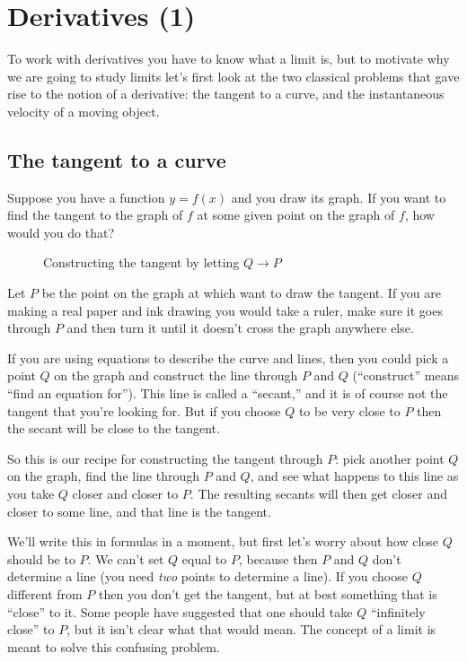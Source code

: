 \chapter{Derivatives (1)}
\label{ch:derivs1}
To work with derivatives you have to know what a limit is, but to motivate why
we are going to study limits let's first look at the two classical problems that
gave rise to the notion of a derivative: the tangent to a curve, and the
instantaneous velocity of a moving object.

\section{The tangent to a curve}
\label{sec:tangent} Suppose you have a function $y=f(x)$ and you draw its graph.
If you want to find the tangent to the graph of $f$ at some given point on the
graph of $f$, how would you do that?

\begin{figure}[h]\centering
  
  \caption{Constructing the tangent by letting $Q\to P$}
  \label{fig:constructTheTangent}
\end{figure}

Let $P$ be the point on the graph at which want to draw the tangent.
If you are making a real paper and ink drawing you would take a ruler,
make sure it goes through $P$ and then turn it until it doesn't cross
the graph anywhere else.

If you are using equations to describe the curve and lines, then you
could pick a point $Q$ on the graph and construct the line through $P$
and $Q$ (``construct'' means ``find an equation for'').  This line is
called a ``secant,'' and it is of course not the tangent that you're
looking for. But if you choose $Q$ to be very close to $P$ then the
secant will be close to the tangent.

So this is our recipe for constructing the tangent through $P$: pick
another point $Q$ on the graph, find the line through $P$ and $Q$, and
see what happens to this line as you take $Q$ closer and closer to
$P$.  The resulting secants will then get closer and closer to some
line, and that line is the tangent.

We'll write this in formulas in a moment, but first let's worry about
how close $Q$ should be to $P$.  We can't set $Q$ equal to $P$,
because then $P$ and $Q$ don't determine a line (you need \emph{two}
points to determine a line).  If you choose $Q$ different from $P$
then you don't get the tangent, but at best something that is
``close'' to it.  Some people have suggested that one should take $Q$
``infinitely close'' to $P$, but it isn't clear what that would mean.
The concept of a limit is meant to solve this confusing problem.



